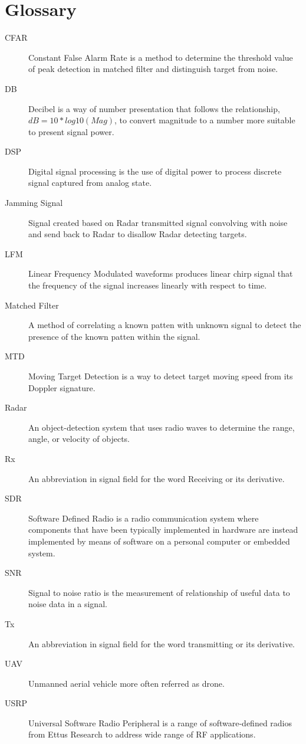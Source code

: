 \documentclass[letterpaper, 12 pt, conference]{report}
\numberwithin{figure}{section}
\begin{document}
\section{Glossary}
\begin{description}
	\item[CFAR] Constant False Alarm Rate is a method to determine the threshold value of peak detection in matched filter and distinguish target from noise.
	\item[DB] Decibel is a way of number presentation that follows the relationship, $dB = 10*log10(Mag)$, to convert magnitude to a number more suitable to present signal power.
	\item[DSP] Digital signal processing is the use of digital power to process discrete signal captured from analog state. 
	\item[Jamming Signal] Signal created based on Radar transmitted signal convolving with noise and send back to Radar to disallow Radar detecting targets. 
	\item[LFM] Linear Frequency Modulated waveforms produces linear chirp signal that the frequency of the signal increases linearly with respect to time.
	\item[Matched Filter] A method of correlating a known patten with unknown signal to detect the presence of the known patten within the signal.
	\item[MTD] Moving Target Detection is a way to detect target moving speed from its Doppler signature. 
	\item[Radar] An object-detection system that uses radio waves to determine the range, angle, or velocity of objects. 
	\item[Rx] An abbreviation in signal field for the word Receiving or its derivative. 
	\item[SDR] Software Defined Radio is a radio communication system where components that have been typically implemented in hardware are instead implemented by means of software on a personal computer or embedded system. \cite{sdr}
	\item[SNR] Signal to noise ratio is the measurement of relationship of useful data to noise data in a signal.
	\item[Tx] An abbreviation in signal field for the word transmitting or its derivative. 
	\item[UAV] Unmanned aerial vehicle more often referred as drone.
	\item[USRP] Universal Software Radio Peripheral is a range of software-defined radios from Ettus Research to address wide range of RF applications.\cite{usrp}
\end{description}
\clearpage
\fontsize{12}{15}\selectfont
\setcounter{secnumdepth}{10}
\end{document}
